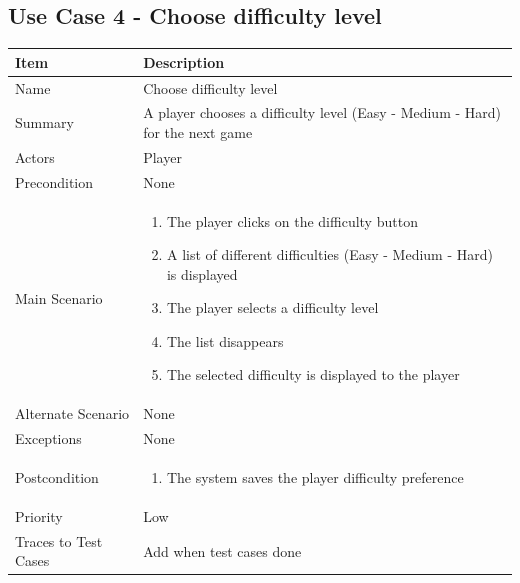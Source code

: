 \documentclass[12pt]{article}
\begin{document}
\newpage


\subsection{Use Case 4 - Choose difficulty level} 

\begin{center}
\setlength{\tabcolsep}{18pt}
\renewcommand{\arraystretch}{1.3}
\begin{tabular}{ |p{3.4cm}|p{10cm}| }
    \hline
   \textbf{Item} & \textbf{Description} \\
    \hline
    Name & Choose difficulty level \\
    \hline
    Summary & A player chooses a difficulty level (Easy - Medium - Hard) for the next game \\
    \hline
    Actors & Player \\
    \hline
    Precondition & 
    None \\
    \hline
    Main Scenario &     
    \vspace*{-0.1in}
    \begin{enumerate}[leftmargin=0.2in]
        \item The player clicks on the difficulty button
        \item A list of different difficulties (Easy - Medium - Hard) is displayed
        \item The player selects a difficulty level 
        \item The list disappears
        \item The selected difficulty is displayed to the player
    \end{enumerate}  \\
    \hline
    Alternate Scenario & None \\
    \hline
    Exceptions &  None\\
    \hline
    Postcondition & 
    \vspace*{-0.1in}
    \begin{enumerate}[leftmargin=0.2in]
        \item The system saves the player difficulty preference
    \end{enumerate}  \\
    \hline
    Priority & Low  \\
    \hline
    Traces to Test Cases & Add when test cases done  \\
    \hline
\end{tabular}
\end{center}
\end{document}
